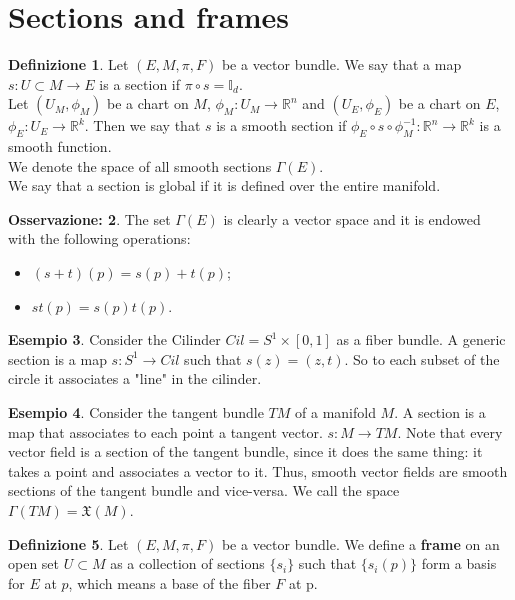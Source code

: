 \documentclass[12pt,a4paper]{report}
\theoremstyle{definition}
\newtheorem{Def}{Definizione}[chapter]
\theoremstyle{Theorem}
\theoremstyle{definition}
\newtheorem{Ex}[Def]{Esempio}
\theoremstyle{definition}
\theoremstyle{definition}
\newtheorem{Obs}[Def]{Osservazione:}
\begin{document}
	\section{Sections and frames}
	\begin{Def}
		Let $(E,M,\pi,F)$ be a vector bundle. We say that a map \\$s:U\subset M\rightarrow E$ is a section if $\pi\circ s=\mathbb{I}_d$. \\
		Let $(U_M,\phi_M)$ be a chart on $M$, $\phi_M:U_M\rightarrow \mathbb{R}^n$ and $(U_E,\phi_E)$ be a chart on $E$, $\phi_E:U_E\rightarrow \mathbb{R}^k$. Then we say that $s$ is a smooth section if $\phi_E\circ s\circ \phi^{-1}_M:\mathbb{R}^n\rightarrow \mathbb{R}^k$ is a smooth function.\\
		We denote the space of all smooth sections $\Gamma(E)$.
		\\
		We say that a section is global if it is defined over the entire manifold.
	\end{Def}
	\begin{Obs}\label{Obs_1.1}
		The set $\Gamma(E)$ is clearly a vector space and it is endowed with the following operations:
		\begin{itemize}
			\item $(s+t)(p)=s(p)+t(p)$;
			\item $st(p)=s(p)t(p)$.
		\end{itemize}
	\end{Obs}
	\begin{Ex}\label{Ex_1.4}
		Consider the Cilinder $Cil=S^1\times [0,1]$ as a fiber bundle. A generic section is a map $s:S^1\rightarrow Cil$ such that $s(z)=(z,t)$. So to each subset of the circle it associates a "line" in the cilinder.
	\end{Ex}
	\begin{Ex}
		Consider the tangent bundle $TM$ of a manifold $M$. A section is a map that associates to each point a tangent vector. $s:M\rightarrow TM$. Note that every vector field is a section of the tangent bundle, since it does the same thing: it takes a point and associates a vector to it. Thus, smooth vector fields are smooth sections of the tangent bundle and vice-versa. We call the space $\Gamma(TM)=\mathfrak{X}(M)$.
	\end{Ex}
	\begin{Def}
		Let $(E,M,\pi,F)$ be a vector bundle. We define a \textbf{frame} on an open set $U\subset M$ as a collection of sections $\{s_i\}$ such that $\{s_i(p)\}$ form a basis for $E$ at $p$, which means a base of the fiber $F$ at p. 
	\end{Def}
\end{document}
